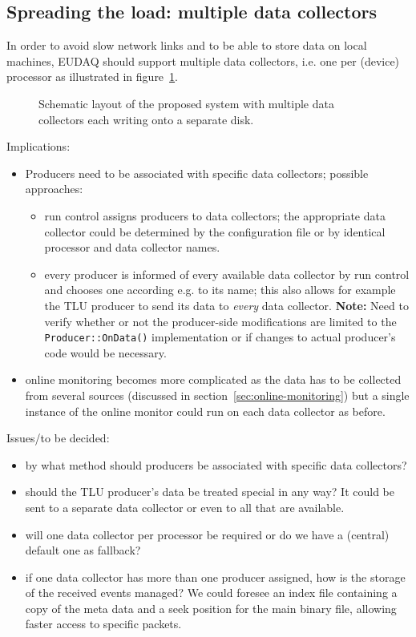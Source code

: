 \documentclass[paper=a4, fontsize=11pt, titlepage]{scrartcl}	%
\numberwithin{equation}{section}		%
\numberwithin{figure}{section}			%
\numberwithin{table}{section}           	%
\begin{document}
\subsection{Spreading the load: multiple data collectors}
\label{sec:datacollectors}
In order to avoid slow network links and to be able to store data on
local machines, EUDAQ should support multiple data collectors,
i.e. one per (device) processor as illustrated in figure~\ref{fig:schematiclayout}.

\begin{figure}[htbp]
  \centering
  
  \caption{Schematic layout of the proposed system with multiple data
    collectors each writing onto a separate disk.}
\label{fig:schematiclayout}
\end{figure}

Implications:
\begin{itemize}
\item Producers need to be associated with specific data collectors;
  possible approaches:
  \begin{itemize}
  \item run control assigns producers to data
    collectors; the appropriate data collector could be determined by the
    configuration file or by identical processor and data collector names.
  \item every producer is informed of every available data collector
    by run control and chooses one according e.g. to its name; this
    also allows for example the TLU producer to send its data to
    \emph{every} data collector. \textbf{Note:} Need to verify whether
    or not the producer-side modifications are limited to the
    \texttt{Producer::OnData()} implementation or if changes to actual
    producer's code would be necessary.
  \end{itemize}
\item online monitoring becomes more complicated as the data has to be
  collected from several sources (discussed in
  section~\ref{sec:online-monitoring}) but a single instance of the online monitor
  could run on each data collector as before.
\end{itemize}

Issues/to be decided:
\begin{itemize}
\item by what method should producers be associated with specific data collectors?
\item should the TLU producer's data be treated special in any way? It
  could be sent to a separate data collector or even to all that are available.
\item will one data collector per processor be required or do we have
  a (central) default one as fallback?
\item if one data collector has more than one producer assigned, how
  is the storage of the received events managed? We could foresee an
  index file containing a copy of the meta data and a seek position
  for the main binary file, allowing faster access to specific packets.
\end{itemize}
\end{document}
